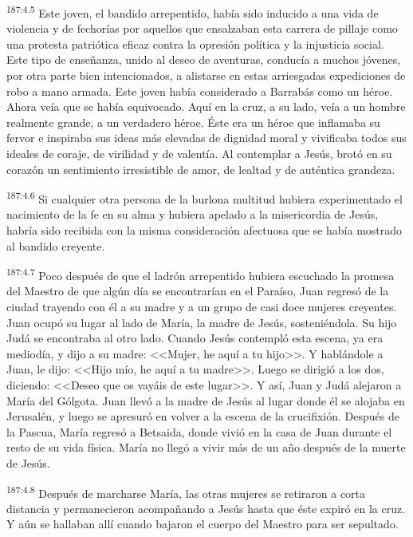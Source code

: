 \par 
\textsuperscript{187:4.5} Este joven, el bandido arrepentido, había sido inducido a una vida de violencia y de fechorías por aquellos que ensalzaban esta carrera de pillaje como una protesta patriótica eficaz contra la opresión política y la injusticia social. Este tipo de enseñanza, unido al deseo de aventuras, conducía a muchos jóvenes, por otra parte bien intencionados, a alistarse en estas arriesgadas expediciones de robo a mano armada. Este joven había considerado a Barrabás como un héroe. Ahora veía que se había equivocado. Aquí en la cruz, a su lado, veía a un hombre realmente grande, a un verdadero héroe. Éste era un héroe que inflamaba su fervor e inspiraba sus ideas más elevadas de dignidad moral y vivificaba todos sus ideales de coraje, de virilidad y de valentía. Al contemplar a Jesús, brotó en su corazón un sentimiento irresistible de amor, de lealtad y de auténtica grandeza.

\par 
\textsuperscript{187:4.6} Si cualquier otra persona de la burlona multitud hubiera experimentado el nacimiento de la fe en su alma y hubiera apelado a la misericordia de Jesús, habría sido recibida con la misma consideración afectuosa que se había mostrado al bandido creyente.

\par 
\textsuperscript{187:4.7} Poco después de que el ladrón arrepentido hubiera escuchado la promesa del Maestro de que algún día se encontrarían en el Paraíso, Juan regresó de la ciudad trayendo con él a su madre y a un grupo de casi doce mujeres creyentes. Juan ocupó su lugar al lado de María, la madre de Jesús, sosteniéndola. Su hijo Judá se encontraba al otro lado. Cuando Jesús contempló esta escena, ya era mediodía, y dijo a su madre: <<Mujer, he aquí a tu hijo>>. Y hablándole a Juan, le dijo: <<Hijo mío, he aquí a tu madre>>. Luego se dirigió a los dos, diciendo: <<Deseo que os vayáis de este lugar>>. Y así, Juan y Judá alejaron a María del Gólgota. Juan llevó a la madre de Jesús al lugar donde él se alojaba en Jerusalén, y luego se apresuró en volver a la escena de la crucifixión. Después de la Pascua, María regresó a Betsaida, donde vivió en la casa de Juan durante el resto de su vida física. María no llegó a vivir más de un año después de la muerte de Jesús.

\par 
\textsuperscript{187:4.8} Después de marcharse María, las otras mujeres se retiraron a corta distancia y permanecieron acompañando a Jesús hasta que éste expiró en la cruz. Y aún se hallaban allí cuando bajaron el cuerpo del Maestro para ser sepultado.

